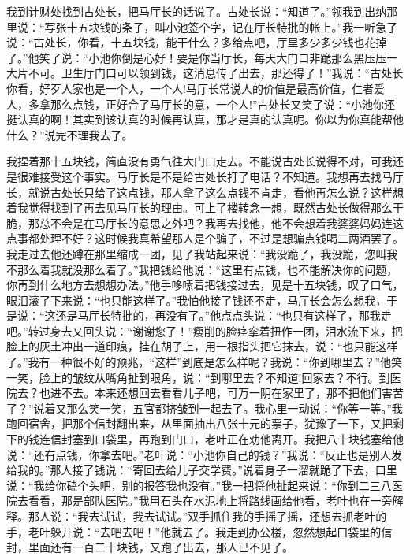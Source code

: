 \documentclass[12pt,oneside]{book}
\begin{document}
我到计财处找到古处长，把马厅长的话说了。古处长说：``知道了。''领我到出纳那里说：``写张十五块钱的条子，叫小池签个字，记在厅长特批的帐上。''我一听急了说：``古处长，你看，十五块钱，能干什么？多给点吧，厅里多少多少钱也花掉了。''他笑了说：``小池你倒是心好！要是你当厅长，每天大门口非跪那么黑压压一大片不可。卫生厅门口可以领到钱，这消息传了出去，那还得了！''我说：``古处长你看，好歹人家也是一个人，一个人!马厅长常说人的价值是最高价值，仁者爱人，多拿那么点钱，正好合了马厅长的意，一个人!''古处长又笑了说：``小池你还挺认真的啊！其实到该认真的时候再认真，那才是真的认真呢。你以为你真能帮他什么？''说完不理我去了。

我捏着那十五块钱，简直没有勇气往大门口走去。不能说古处长说得不对，可我还是很难接受这个事实。马厅长是不是给古处长打了电话？不知道。我想再去找马厅长，就说古处长只给了这点钱，那人拿了这么点钱不肯走，看他再怎么说？这样想着我觉得找到了再去见马厅长的理由。可上了楼转念一想，既然古处长做得那么干脆，那总不会是在马厅长的意思之外吧？我再去找他，他不会想着我婆婆妈妈连这点事都处理不好？这时候我真希望那人是个骗子，不过是想骗点钱喝二两酒罢了。我走过去他还蹲在那里缩成一团，见了我站起来说：``我没跪了，我没跪，您叫我不那么着我就没那么着了。''我把钱给他说：``这里有点钱，也不能解决你的问题，你再到什么地方去想想办法。''他手哆嗦着把钱接过去，见是十五块钱，叹了口气，眼泪滚了下来说：``也只能这样了。''我怕他接了钱还不走，马厅长会怎么想我，于是说：``这还是马厅长特批的，再没有了。''他点点头说：``也只有这样了，那我走吧。''转过身去又回头说：``谢谢您了！''瘦削的脸痉挛着扭作一团，泪水流下来，把脸上的灰土冲出一道印痕，挂在胡子上，用一根指头把它抹去，说：``也只能这样了。''我有一种很不好的预兆，``这样''到底是怎么样呢？我说：``你到哪里去？''他笑一笑，脸上的皱纹从嘴角扯到眼角，说：``到哪里去？不知道!回家去？不行。到医院去？也进不去。本来还想回去看看儿子吧，可万一阴在家里了，那不把他们害苦了？''说着又那么笑一笑，五官都挤皱到一起去了。我心里一动说：``你等一等。''我跑回宿舍，把那个信封翻出来，从里面抽出八张十元的票子，犹豫了一下，又把剩下的钱连信封塞到口袋里，再跑到门口，老叶正在劝他离开。我把八十块钱塞给他说：``还有点钱，你拿去吧。''老叶说：``小池你自己的钱？''我说：``反正也是别人发给我的。''那人接了钱说：``寄回去给儿子交学费。''说着身子一溜就跪了下去，口里说：``我给你磕个头吧，别的报答我也没有。''我一把将他扯起来说：``你到二三八医院去看看，那是部队医院。''我用石头在水泥地上将路线画给他看，老叶也在一旁解释。那人说：``我去试试，我去试试。''双手抓住我的手摇了摇，还想去抓老叶的手，老叶躲开说：``去吧去吧！''他就去了。我走到办公楼，忽然想起口袋里的信封，里面还有一百二十块钱，又跑了出去，那人已不见了。
\end{document}
